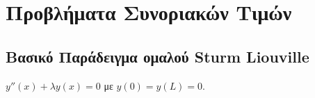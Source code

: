 



\geometry{top=1cm,margin=1cm}

\pagestyle{vangelis}
\everymath{\displaystyle}
\setcounter{chapter}{1}



\chapter*{Προβλήματα Συνοριακών Τιμών}

\section*{Βασικό Παράδειγμα ομαλού Sturm Liouville}


\begin{mybox3}
\begin{example}
  $ y''(x) + \lambda y(x)=0 $ με $ y(0)=y(L)=0 $.
\end{example}
\end{mybox3}
